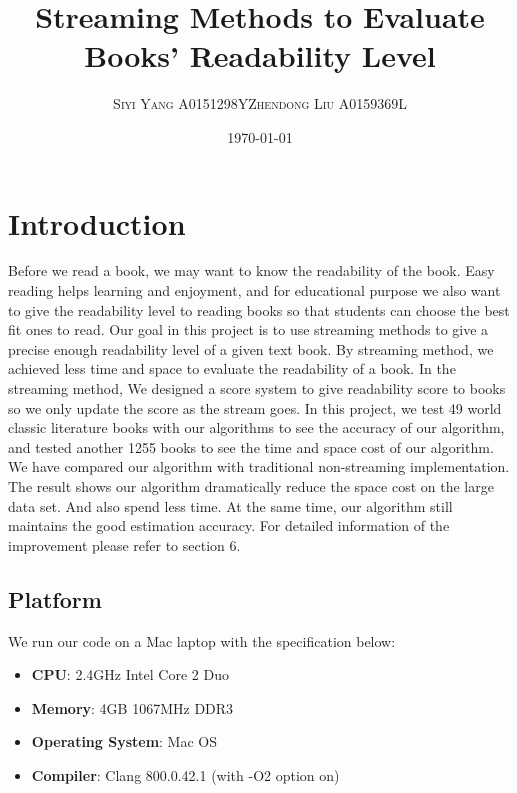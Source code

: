 \documentclass{article}
\title{Streaming Methods to Evaluate Books' Readability Level} %
\author{\textsc{Siyi Yang} A0151298Y\quad \textsc{Zhendong Liu} A0159369L} %
\date{\today} %
\begin{document}
\maketitle %
\section{Introduction}
Before we read a book, we may want to know the readability of the book. Easy reading helps learning and enjoyment\cite{fry}, and for educational purpose we also want to give the readability level to reading books so that students can choose the best fit ones to read. 
\newline
\newline
Our goal in this project is to use streaming methods to give a precise enough readability level of a given text book. By streaming method, we achieved less time and space to evaluate the readability of a book. In the streaming method, We designed a score system to give readability score to books so we only update the score as the stream goes. In this project, we test 49 world classic literature books with our algorithms to see the accuracy of our algorithm, and tested another 1255 books to see the time and space cost of our algorithm.
\newline
\newline
We have compared our algorithm with traditional non-streaming implementation. The result shows our algorithm dramatically reduce the space cost on the large data set. And also spend less time. At the same time, our algorithm still maintains the good estimation accuracy. For detailed information of the improvement please refer to section 6.
\subsection{Platform}
We run our code on a Mac laptop with the specification below:
\begin{itemize}
\item \textbf{CPU}: 2.4GHz Intel Core 2 Duo
\item \textbf{Memory}: 4GB 1067MHz DDR3
\item \textbf{Operating System}: Mac OS
\item \textbf{Compiler}: Clang 800.0.42.1 (with -O2 option on)
\end{itemize}
\end{document}
